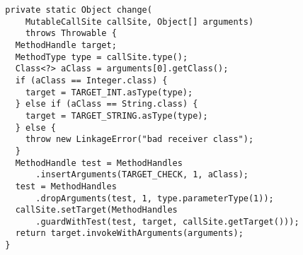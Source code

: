 {\scriptsize \begin{verbatim}
  private static Object change(
      MutableCallSite callSite, Object[] arguments)
      throws Throwable {
    MethodHandle target;
    MethodType type = callSite.type();
    Class<?> aClass = arguments[0].getClass();
    if (aClass == Integer.class) {
      target = TARGET_INT.asType(type);
    } else if (aClass == String.class) {
      target = TARGET_STRING.asType(type);
    } else {
      throw new LinkageError("bad receiver class");
    }
    MethodHandle test = MethodHandles
        .insertArguments(TARGET_CHECK, 1, aClass);
    test = MethodHandles
        .dropArguments(test, 1, type.parameterType(1));
    callSite.setTarget(MethodHandles
        .guardWithTest(test, target, callSite.getTarget()));
    return target.invokeWithArguments(arguments);
  }
\end{verbatim} }
